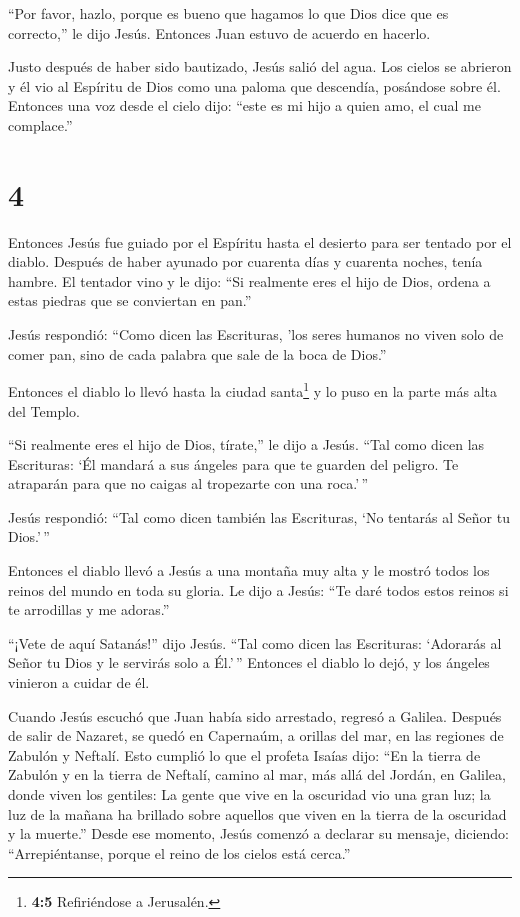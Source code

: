  ``Por favor, hazlo, porque es bueno que hagamos lo que
Dios dice que es correcto,'' le dijo Jesús. Entonces Juan estuvo de
acuerdo en hacerlo.

 Justo después de haber sido bautizado, Jesús salió del
agua. Los cielos se abrieron y él vio al Espíritu de Dios como una
paloma que descendía, posándose sobre él.  Entonces una voz
desde el cielo dijo: ``este es mi hijo a quien amo, el cual me
complace.''

\hypertarget{section-3}{%
\section{4}\label{section-3}}

 Entonces Jesús fue guiado por el Espíritu hasta el desierto
para ser tentado por el diablo.  Después de haber ayunado
por cuarenta días y cuarenta noches, tenía hambre.  El
tentador vino y le dijo: ``Si realmente eres el hijo de Dios, ordena a
estas piedras que se conviertan en pan.''

 Jesús respondió: ``Como dicen las Escrituras, 'los seres
humanos no viven solo de comer pan, sino de cada palabra que sale de la
boca de Dios.''

 Entonces el diablo lo llevó hasta la ciudad
santa\footnote{\textbf{4:5} Refiriéndose a Jerusalén.} y lo puso en la
parte más alta del Templo.

 ``Si realmente eres el hijo de Dios, tírate,'' le dijo a
Jesús. ``Tal como dicen las Escrituras: `Él mandará a sus ángeles para
que te guarden del peligro. Te atraparán para que no caigas al
tropezarte con una roca.'\,''

 Jesús respondió: ``Tal como dicen también las Escrituras,
`No tentarás al Señor tu Dios.'\,''

 Entonces el diablo llevó a Jesús a una montaña muy alta y
le mostró todos los reinos del mundo en toda su gloria.  Le
dijo a Jesús: ``Te daré todos estos reinos si te arrodillas y me
adoras.''

 ``¡Vete de aquí Satanás!'' dijo Jesús. ``Tal como dicen
las Escrituras: `Adorarás al Señor tu Dios y le servirás solo a Él.'\,''
 Entonces el diablo lo dejó, y los ángeles vinieron a
cuidar de él.

 Cuando Jesús escuchó que Juan había sido arrestado,
regresó a Galilea.  Después de salir de Nazaret, se quedó
en Capernaúm, a orillas del mar, en las regiones de Zabulón y Neftalí.
 Esto cumplió lo que el profeta Isaías dijo: 
``En la tierra de Zabulón y en la tierra de Neftalí, camino al mar, más
allá del Jordán, en Galilea, donde viven los gentiles:  La
gente que vive en la oscuridad vio una gran luz; la luz de la mañana ha
brillado sobre aquellos que viven en la tierra de la oscuridad y la
muerte.''  Desde ese momento, Jesús comenzó a declarar su
mensaje, diciendo: ``Arrepiéntanse, porque el reino de los cielos está
cerca.''

